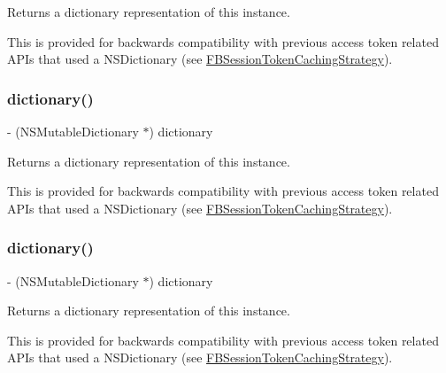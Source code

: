 Returns a dictionary representation of this instance.

This is provided for backwards compatibility with previous access token related A\+P\+Is that used a N\+S\+Dictionary (see {\ttfamily \hyperlink{interfaceFBSessionTokenCachingStrategy}{F\+B\+Session\+Token\+Caching\+Strategy}}). \mbox{\label{interfaceFBAccessTokenData_aca74d0fd769aea62fb70912bec9aba4d}} 
\subsubsection{\texorpdfstring{dictionary()}{dictionary()}\hspace{0.1cm}{\footnotesize\ttfamily [4/5]}}
{\footnotesize\ttfamily -\/ (N\+S\+Mutable\+Dictionary $\ast$) dictionary \begin{DoxyParamCaption}{ }\end{DoxyParamCaption}}

Returns a dictionary representation of this instance.

This is provided for backwards compatibility with previous access token related A\+P\+Is that used a N\+S\+Dictionary (see {\ttfamily \hyperlink{interfaceFBSessionTokenCachingStrategy}{F\+B\+Session\+Token\+Caching\+Strategy}}). \mbox{\label{interfaceFBAccessTokenData_aca74d0fd769aea62fb70912bec9aba4d}} 
\subsubsection{\texorpdfstring{dictionary()}{dictionary()}\hspace{0.1cm}{\footnotesize\ttfamily [5/5]}}
{\footnotesize\ttfamily -\/ (N\+S\+Mutable\+Dictionary $\ast$) dictionary \begin{DoxyParamCaption}{ }\end{DoxyParamCaption}}

Returns a dictionary representation of this instance.

This is provided for backwards compatibility with previous access token related A\+P\+Is that used a N\+S\+Dictionary (see {\ttfamily \hyperlink{interfaceFBSessionTokenCachingStrategy}{F\+B\+Session\+Token\+Caching\+Strategy}}). \mbox{\label{interfaceFBAccessTokenData_ac4da9dbf9d0c3c0bceb2d6b93cd764e2}} 
